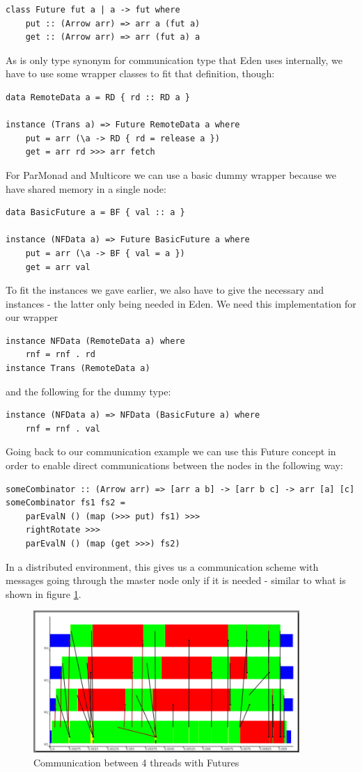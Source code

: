 \begin{lstlisting}[frame=htrbl]
class Future fut a | a -> fut where
    put :: (Arrow arr) => arr a (fut a)
    get :: (Arrow arr) => arr (fut a) a
\end{lstlisting}
As  is only type synonym for communication type that Eden uses internally, we have to use some wrapper classes to fit that definition, though:
\begin{lstlisting}[frame=htrbl]
data RemoteData a = RD { rd :: RD a }

instance (Trans a) => Future RemoteData a where
    put = arr (\a -> RD { rd = release a })
    get = arr rd >>> arr fetch
\end{lstlisting}
For ParMonad and Multicore we can use a basic dummy wrapper because we have shared memory in a single node:
\begin{lstlisting}[frame=htrbl]
data BasicFuture a = BF { val :: a }

instance (NFData a) => Future BasicFuture a where
    put = arr (\a -> BF { val = a })
    get = arr val
\end{lstlisting}
To fit the  instances we gave earlier, we also have to give the necessary  and  instances - the latter only being needed in Eden.
We need this implementation for our  wrapper
\begin{lstlisting}[frame=htrbl]
instance NFData (RemoteData a) where
    rnf = rnf . rd
instance Trans (RemoteData a)
\end{lstlisting}
and the following for the  dummy type:
\begin{lstlisting}[frame=htrbl]
instance (NFData a) => NFData (BasicFuture a) where
	rnf = rnf . val
\end{lstlisting}
Going back to our communication example we can use this Future concept in order to enable direct communications between the nodes in the following way:
\begin{lstlisting}[frame=htrbl]
someCombinator :: (Arrow arr) => [arr a b] -> [arr b c] -> arr [a] [c]
someCombinator fs1 fs2 =
	parEvalN () (map (>>> put) fs1) >>>
	rightRotate >>>
	parEvalN () (map (get >>>) fs2)
\end{lstlisting}
In a distributed environment, this gives us a communication scheme with messages going through the master node only if it is needed - similar to what is shown in figure \ref{fig:withFutures}.
\begin{figure}[ht]
	\centering
	\includegraphics[width=0.9\textwidth]{images/withFutures}
	\caption[with Futures]{Communication between 4 threads with Futures}
	\label{fig:withFutures}
\end{figure}
